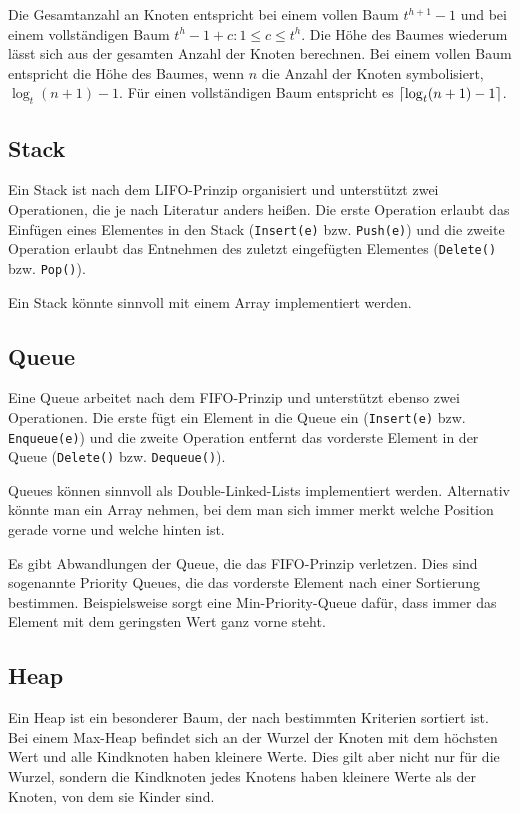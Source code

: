 \documentclass[10pt,a4paper,oneside,ngerman,numbers=noenddot]{scrartcl}
\DeclarePairedDelimiter{\ceil}{\lceil}{\rceil}
\begin{document}
		Die Gesamtanzahl an Knoten entspricht bei einem vollen Baum $t^{h+1}-1$ und bei einem vollständigen Baum $t^{h} - 1 + c : 1 \leq c \leq t^{h}$. Die Höhe des Baumes wiederum lässt sich aus der gesamten Anzahl der Knoten berechnen. Bei einem vollen Baum entspricht die Höhe des Baumes, wenn $n$ die Anzahl der Knoten symbolisiert, $\log_{t}(n+1) - 1$. Für einen vollständigen Baum entspricht es $\ceil*{\log_{t}(n+1)-1}$.
		
	\subsection{Stack}
	
		Ein Stack ist nach dem LIFO-Prinzip organisiert und unterstützt zwei Operationen, die je nach Literatur anders heißen. Die erste Operation erlaubt das Einfügen eines Elementes in den Stack (\texttt{Insert(e)} bzw. \texttt{Push(e)}) und die zweite Operation erlaubt das Entnehmen des zuletzt eingefügten Elementes (\texttt{Delete()} bzw. \texttt{Pop()}).
		
		Ein Stack könnte sinnvoll mit einem Array implementiert werden.
		
	\subsection{Queue}
	
		Eine Queue arbeitet nach dem FIFO-Prinzip und unterstützt ebenso zwei Operationen. Die erste fügt ein Element in die Queue ein (\texttt{Insert(e)} bzw. \texttt{Enqueue(e)}) und die zweite Operation entfernt das vorderste Element in der Queue (\texttt{Delete()} bzw. \texttt{Dequeue()}).
		
		Queues können sinnvoll als Double-Linked-Lists implementiert werden. Alternativ könnte man ein Array nehmen, bei dem man sich immer merkt welche Position gerade vorne und welche hinten ist.
		
		Es gibt Abwandlungen der Queue, die das FIFO-Prinzip verletzen. Dies sind sogenannte Priority Queues, die das vorderste Element nach einer Sortierung bestimmen. Beispielsweise sorgt eine Min-Priority-Queue dafür, dass immer das Element mit dem geringsten Wert ganz vorne steht.
		
	\subsection{Heap}
	
		Ein Heap ist ein besonderer Baum, der nach bestimmten Kriterien sortiert ist. Bei einem Max-Heap befindet sich an der Wurzel der Knoten mit dem höchsten Wert und alle Kindknoten haben kleinere Werte. Dies gilt aber nicht nur für die Wurzel, sondern die Kindknoten jedes Knotens haben kleinere Werte als der Knoten, von dem sie Kinder sind.
		
\end{document}
